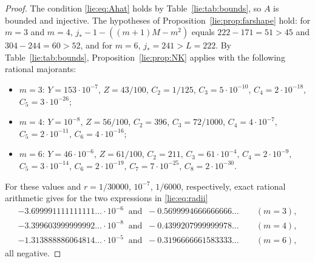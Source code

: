 \documentclass[11pt]{amsart}
\theoremstyle{definition}
\theoremstyle{remark}
\numberwithin{equation}{section}
\newcommand{\jst}{j_*}
\begin{document}
\begin{proof}
The condition \eqref{lie:eq:Ahat} holds by Table~\ref{lie:tab:bounds}, so $A$ is bounded and injective. The hypotheses of Proposition~\ref{lie:prop:farshape} hold: for $m=3$ and $m=4$, $\jst-1-((m+1)M-m^2)$ equals $222-171=51>45$ and $304-244=60>52$, and for $m=6$, $\jst=241>L=222$. By Table~\ref{lie:tab:bounds}, Proposition~\ref{lie:prop:NK} applies with the following rational majorants:
\begin{itemize}
\item $m=3$: $Y=153\cdot10^{-7}$, $Z=43/100$, $C_2=1/125$, $C_3=5\cdot10^{-10}$, $C_4=2\cdot10^{-18}$, $C_5=3\cdot10^{-26}$;
\item $m=4$: $Y=10^{-8}$, $Z=56/100$, $C_2=396$, $C_3=72/1000$, $C_4=4\cdot10^{-7}$, $C_5=2\cdot10^{-11}$, $C_6=4\cdot10^{-16}$;
\item $m=6$: $Y=46\cdot10^{-6}$, $Z=61/100$, $C_2=211$, $C_3=61\cdot10^{-4}$, $C_4=2\cdot10^{-9}$, $C_5=3\cdot10^{-14}$, $C_6=2\cdot10^{-19}$, $C_7=7\cdot10^{-25}$, $C_8=2\cdot10^{-30}$.
\end{itemize}
For these values and $r=1/30000$, $10^{-7}$, $1/6000$, respectively, exact rational arithmetic gives for the two expressions in \eqref{lie:eq:radii}
\begin{gather*}
-3.699991111111111\ldots\cdot10^{-6}\ \text{ and }\ -0.5699994666666666\ldots\qquad(m=3),\\
-3.399603999999992\ldots\cdot10^{-8}\ \text{ and }\ -0.4399207999999978\ldots\qquad(m=4),\\
-1.313888886064814\ldots\cdot10^{-5}\ \text{ and }\ -0.3196666661583333\ldots\qquad(m=6),
\end{gather*}
all negative.
\end{proof}
\end{document}
